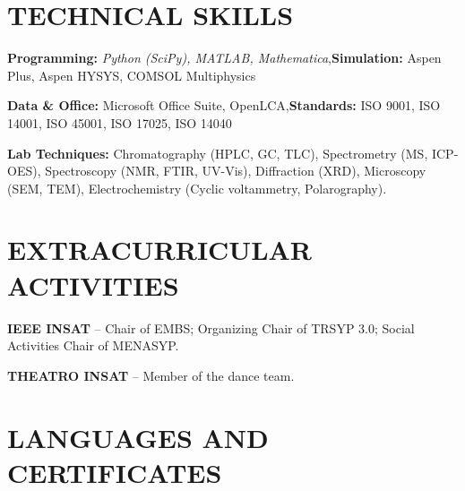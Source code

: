 \documentclass[10pt]{article}
\begin{document}
\section{TECHNICAL SKILLS}
\begin{bul}
\item \textbf{Programming:} \textit{Python (SciPy), MATLAB, Mathematica}\sep\textbf{Simulation:} Aspen Plus, Aspen HYSYS, COMSOL Multiphysics
\item \textbf{Data \& Office:} Microsoft Office Suite, OpenLCA\sep\textbf{Standards:} ISO 9001, ISO 14001, ISO 45001, ISO 17025, ISO 14040
\item \textbf{Lab Techniques:} Chromatography (HPLC, GC, TLC), Spectrometry (MS, ICP-OES), Spectroscopy (NMR, FTIR, UV-Vis), Diffraction (XRD), Microscopy (SEM, TEM), Electrochemistry (Cyclic voltammetry, Polarography).
\end{bul}

\section{EXTRACURRICULAR ACTIVITIES}
\begin{bul}
\item \textbf{IEEE INSAT} – Chair of EMBS; Organizing Chair of TRSYP 3.0; Social Activities Chair of MENASYP.
\item \textbf{THEATRO INSAT} – Member of the dance team.
\end{bul}

\section{LANGUAGES AND CERTIFICATES}
\end{document}

